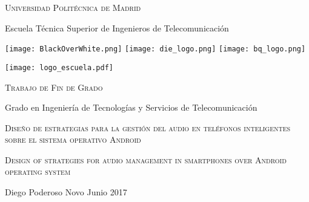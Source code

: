 \begin{titlepage}
	\begin{center}
	
		\large {\textsc{\textsf{Universidad Politécnica de Madrid}}}
		
		\bigskip
		\bigskip
		
		\large {\textsf{Escuela Técnica Superior de Ingenieros de Telecomunicación}}
	
		\bigskip
		\texttt{[image: BlackOverWhite.png]}
		\texttt{[image: die\_logo.png]}
		\texttt{[image: bq\_logo.png]}
		\bigskip

		\texttt{[image: logo\_escuela.pdf]}
		
		\bigskip
		\bigskip
		\bigskip
		
		\large {\textsc{\textsf{Trabajo de Fin de Grado}}}
		
		\bigskip
		\bigskip
		\bigskip
		
		\large {\textsf{Grado en Ingeniería de Tecnologías y Servicios de Telecomunicación}}
		
		\bigskip
		\bigskip
		\bigskip
		
		\large {\textsc{\textsf{Diseño de estrategias para la gestión del audio en teléfonos inteligentes sobre el sistema operativo Android}}}
		
		\bigskip
		
		\large {\textsc{\textsf{Design of strategies for audio management in smartphones over Android operating system}}}
		
		\bigskip
		\bigskip
		\bigskip
		\bigskip
		
		\large {Diego Poderoso Novo}
		\linebreak
		\large {Junio 2017}
				
	\end{center}
\end{titlepage}